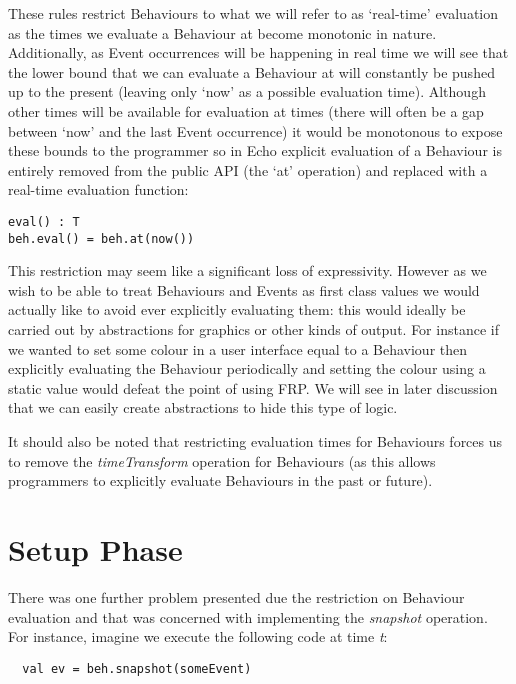     These rules restrict Behaviours to what we will refer to as `real-time' evaluation as the times
    we evaluate a Behaviour at become monotonic in nature. Additionally, as Event occurrences will
    be happening in real time we will see that the lower bound that we can evaluate a Behaviour at will
    constantly be pushed up to the present (leaving only `now' as a possible evaluation time). Although
    other times will be available for evaluation at times (there will often be a gap between `now' and
    the last Event occurrence) it would be monotonous to expose these bounds to the programmer so
    in Echo explicit evaluation of a Behaviour is entirely removed from the public API (the
    `at' operation) and replaced with a real-time evaluation function:

\begin{verbatim}
eval() : T
beh.eval() = beh.at(now())
\end{verbatim}  

    This restriction may seem like a significant loss of expressivity. However as we wish to be able to treat
    Behaviours and Events as first class values we would actually like to avoid ever explicitly evaluating
    them: this would ideally be carried out by abstractions for graphics or other kinds of output. For instance
    if we wanted to set some colour in a user interface equal to a Behaviour then explicitly evaluating the Behaviour
    periodically and setting the colour using a static value would defeat the point of using FRP. We will see in later
    discussion that we can easily create abstractions to hide this type of logic.
    
    It should also be noted that restricting evaluation times for Behaviours forces us
    to remove the \emph{timeTransform} operation for Behaviours (as this allows programmers to explicitly
    evaluate Behaviours in the past or future).
  
    \section{Setup Phase}
      There was one further problem presented due the restriction on Behaviour evaluation and that was concerned with
      implementing the \emph{snapshot} operation. For instance, imagine we execute the following code
      at time \emph{t}:

  \begin{verbatim}
  val ev = beh.snapshot(someEvent)
  \end{verbatim}

